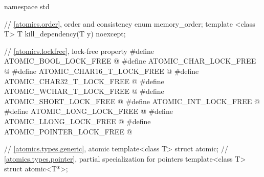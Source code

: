 %
%
\begin{codeblock}
namespace std {
  // \ref{atomics.order}, order and consistency
  enum memory_order;
  template <class T>
    T kill_dependency(T y) noexcept;

  // \ref{atomics.lockfree}, lock-free property
  #define ATOMIC_BOOL_LOCK_FREE @\unspec@
  #define ATOMIC_CHAR_LOCK_FREE @\unspec@
  #define ATOMIC_CHAR16_T_LOCK_FREE @\unspec@
  #define ATOMIC_CHAR32_T_LOCK_FREE @\unspec@
  #define ATOMIC_WCHAR_T_LOCK_FREE @\unspec@
  #define ATOMIC_SHORT_LOCK_FREE @\unspec@
  #define ATOMIC_INT_LOCK_FREE @\unspec@
  #define ATOMIC_LONG_LOCK_FREE @\unspec@
  #define ATOMIC_LLONG_LOCK_FREE @\unspec@
  #define ATOMIC_POINTER_LOCK_FREE @\unspec@

  // \ref{atomics.types.generic}, atomic
  template<class T> struct atomic;
  // \ref{atomics.types.pointer}, partial specialization for pointers
  template<class T> struct atomic<T*>;

}
\end{codeblock}
